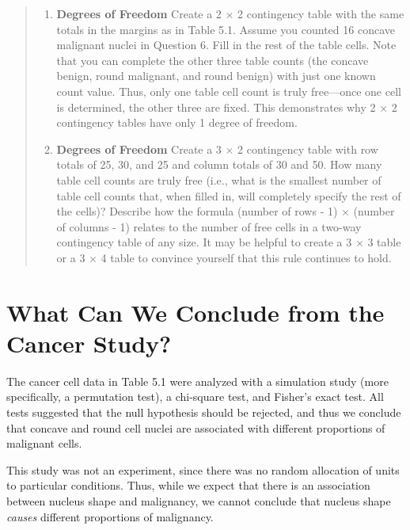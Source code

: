 \documentclass[
]{report}
\providecommand{\tightlist}{%
  \setlength{\itemsep}{0pt}\setlength{\parskip}{0pt}}
\begin{document}
\begin{quote}
\begin{enumerate}
\def\labelenumi{\arabic{enumi}.}
\setcounter{enumi}{19}
\tightlist
\item
  \textbf{Degrees of Freedom} Create a 2 × 2 contingency table with the same totals in the margins as in Table 5.1. Assume you counted 16 concave malignant nuclei in Question 6. Fill in the rest of the table cells. Note that you can complete the other three table counts (the concave benign, round malignant, and round benign) with just one known count value. Thus, only one table cell count is truly free---once one cell is determined, the other three are fixed. This demonstrates why 2 × 2 contingency tables have only 1 degree of freedom.\\
\item
  \textbf{Degrees of Freedom} Create a 3 × 2 contingency table with row totals of 25, 30, and 25 and column totals of 30 and 50. How many table cell counts are truly free (i.e., what is the smallest number of table cell counts that, when filled in, will completely specify the rest of the cells)? Describe how the formula (number of rows - 1) × (number of columns - 1) relates to the number of free cells in a two-way contingency table of any size. It may be helpful to create a 3 × 3 table or a 3 × 4 table to convince yourself that this rule continues to hold.
\end{enumerate}
\end{quote}

\hypertarget{what-can-we-conclude-from-the-cancer-study}{%
\section{\texorpdfstring{\textbf{What Can We Conclude from the Cancer Study?}}{What Can We Conclude from the Cancer Study?}}\label{what-can-we-conclude-from-the-cancer-study}}

The cancer cell data in Table 5.1 were analyzed with a simulation study (more specifically, a permutation test), a chi-square test, and Fisher's exact test. All tests suggested that the null hypothesis should be rejected, and thus we conclude that concave and round cell nuclei are associated with different proportions of malignant cells.

This study was not an experiment, since there was no random allocation of units to particular conditions. Thus, while we expect that there is an association between nucleus shape and malignancy, we cannot conclude that nucleus shape \emph{causes} different proportions of malignancy.
\end{document}
